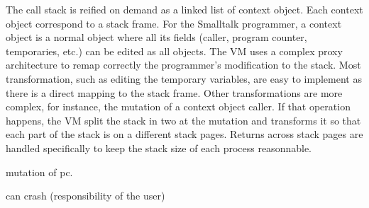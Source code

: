 \documentclass[a4paper,12pt,twoside]{../includes/ThesisStyle}
\begin{document}
The call stack is reified on demand as a linked list of context object. Each context object correspond to a stack frame. For the Smalltalk programmer, a context object is a normal object where all its fields (caller, program counter, temporaries, etc.) can be edited as all objects. The VM uses a complex proxy architecture to remap correctly the programmer's modification to the stack. Most transformation, such as editing the temporary variables, are easy to implement as there is a direct mapping to the stack frame. Other transformations are more complex, for instance, the mutation of a context object caller. If that operation happens, the VM split the stack in two at the mutation and transforms it so that each part of the stack is on a different stack pages. Returns across stack pages are handled specifically to keep the stack size of each process reasonnable.

mutation of pc.

can crash (responsibility of the user)

\ifx\wholebook\relax\else
    
\end{document}
